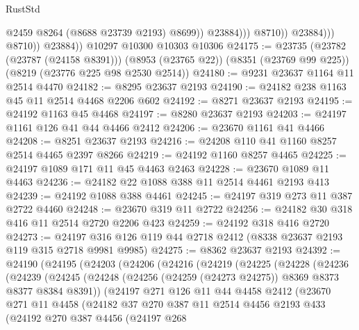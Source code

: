 \begin{lexlean}{RustStd}
\begin{coremodule}
                                @2459
                                @8264
                                (@8688 @23739 @2193)
                                @8699))
                            @23884)))
                      @8710))
                  @23884)))
            @8710))
        @23884))
    @10297
    @10300
    @10303
    @10306
@24175 := @23735
    (@23782 (@23787 (@24158 @8391)))
    (@8953 (@23765 @22))
    (@8351 (@23769 @99 @225))
    (@8219 (@23776 @225 @98 @2530 @2514))
@24180 := @9231 @23637 @1164 @11 @2514 @4470
@24182 := @8295 @23637 @2193
@24190 := @24182 @238 @1163 @45 @11 @2514 @4468 @2206 @602
@24192 := @8271 @23637 @2193
@24195 := @24192 @1163 @45 @4468
@24197 := @8280 @23637 @2193
@24203 := @24197 @1161 @126 @41 @44 @4466 @2412
@24206 := @23670 @1161 @41 @4466
@24208 := @8251 @23637 @2193
@24216 := @24208 @110 @41 @1160 @8257 @2514 @4465 @2397 @8266
@24219 := @24192 @1160 @8257 @4465
@24225 := @24197 @1089 @171 @11 @45 @4463 @2463
@24228 := @23670 @1089 @11 @4463
@24236 := @24182 @22 @1088 @388 @11 @2514 @4461 @2193 @413
@24239 := @24192 @1088 @388 @4461
@24245 := @24197 @319 @273 @11 @387 @2722 @4460
@24248 := @23670 @319 @11 @2722
@24256 := @24182 @30 @318 @416 @11 @2514 @2720 @2206 @423
@24259 := @24192 @318 @416 @2720
@24273 := @24197 @316 @126 @119 @44 @2718 @2412 (@8338 @23637 @2193 @119 @315 @2718 @9981 @9985)
@24275 := @8362 @23637 @2193
@24392 := @24190
    (@24195
      (@24203
        (@24206
          (@24216
            (@24219
              (@24225
                (@24228
                  (@24236
                    (@24239
                      (@24245
                        (@24248 (@24256 (@24259 (@24273 @24275)) @8369 @8373 @8377 @8384 @8391))
                        (@24197
                          @271
                          @126
                          @11
                          @44
                          @4458
                          @2412
                          (@23670
                            @271
                            @11
                            @4458
                            (@24182
                              @37
                              @270
                              @387
                              @11
                              @2514
                              @4456
                              @2193
                              @433
                              (@24192
                                @270
                                @387
                                @4456
                                (@24197
                                  @268

\end{coremodule}
\end{lexlean}
